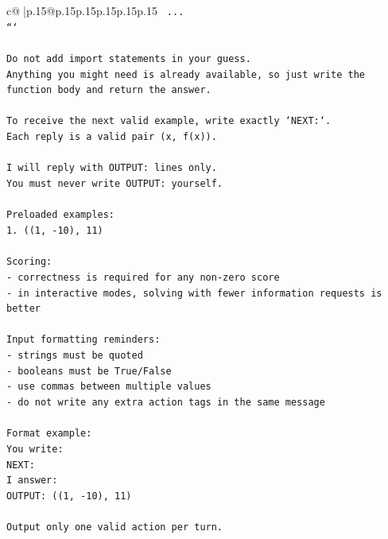 \documentclass{article}
\begin{document}
{\begin{supertabular}{c@{$\;$}|p{.15\linewidth}@{}p{.15\linewidth}p{.15\linewidth}p{.15\linewidth}p{.15\linewidth}p{.15\linewidth}}
{{{\texttt{    ...} \\
\texttt{```} \\
\\ 
\texttt{Do not add import statements in your guess.} \\
\texttt{Anything you might need is already available, so just write the function body and return the answer.} \\
\\ 
\texttt{To receive the next valid example, write exactly `NEXT:`.} \\
\texttt{Each reply is a valid pair (x, f(x)).} \\
\\ 
\texttt{I will reply with OUTPUT: lines only.} \\
\texttt{You must never write OUTPUT: yourself.} \\
\\ 
\texttt{Preloaded examples:} \\
\texttt{1. ((1, {-}10), 11)} \\
\\ 
\texttt{Scoring:} \\
\texttt{{-} correctness is required for any non{-}zero score} \\
\texttt{{-} in interactive modes, solving with fewer information requests is better} \\
\\ 
\texttt{Input formatting reminders:} \\
\texttt{{-} strings must be quoted} \\
\texttt{{-} booleans must be True/False} \\
\texttt{{-} use commas between multiple values} \\
\texttt{{-} do not write any extra action tags in the same message} \\
\\ 
\texttt{Format example:} \\
\texttt{You write:} \\
\texttt{NEXT:} \\
\texttt{I answer:} \\
\texttt{OUTPUT: ((1, {-}10), 11)} \\
\\ 
\texttt{Output only one valid action per turn.} \\
            }
        }
    }
     \\ \\


\end{supertabular}}
\end{document}
